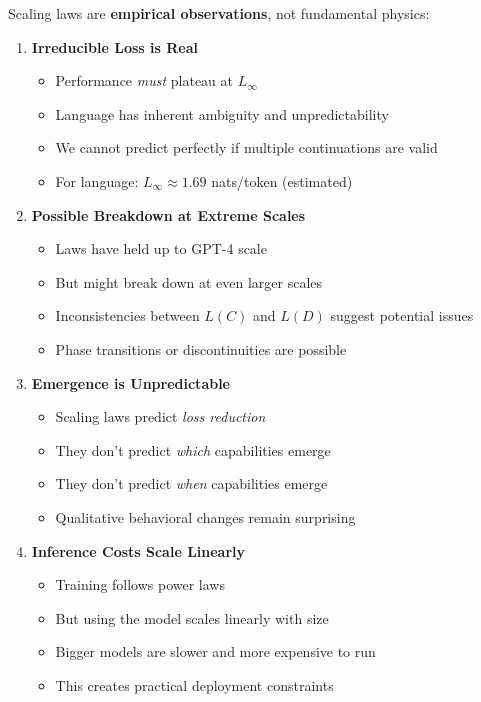 \documentclass{article}
\begin{document}
\begin{tcolorbox}[colback=red!5!white, colframe=red!75!black, title=Warning: Scaling Laws Have Limits]
Scaling laws are \textbf{empirical observations}, not fundamental physics:

\begin{enumerate}
\item \textbf{Irreducible Loss is Real}
\begin{itemize}
\item Performance \textit{must} plateau at $L_{\infty}$
\item Language has inherent ambiguity and unpredictability
\item We cannot predict perfectly if multiple continuations are valid
\item For language: $L_{\infty} \approx 1.69$ nats/token (estimated)
\end{itemize}

\item \textbf{Possible Breakdown at Extreme Scales}
\begin{itemize}
\item Laws have held up to GPT-4 scale
\item But might break down at even larger scales
\item Inconsistencies between $L(C)$ and $L(D)$ suggest potential issues
\item Phase transitions or discontinuities are possible
\end{itemize}

\item \textbf{Emergence is Unpredictable}
\begin{itemize}
\item Scaling laws predict \textit{loss reduction}
\item They don't predict \textit{which} capabilities emerge
\item They don't predict \textit{when} capabilities emerge
\item Qualitative behavioral changes remain surprising
\end{itemize}

\item \textbf{Inference Costs Scale Linearly}
\begin{itemize}
\item Training follows power laws
\item But using the model scales linearly with size
\item Bigger models are slower and more expensive to run
\item This creates practical deployment constraints
\end{itemize}


\end{enumerate}
\end{tcolorbox}
\end{document}
